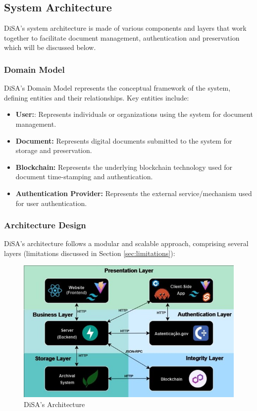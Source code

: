 \documentclass[a4paper,11pt]{article}
\begin{document}
        \subsection{System Architecture}
            \quad DiSA's system architecture is made of various components and layers that work together to facilitate document management, authentication and preservation which will be discussed below.
        
            \subsubsection{Domain Model}
                \quad   DiSA's Domain Model represents the conceptual framework of the system, defining entities and their relationships. Key entities include:
                \begin{itemize}
                    \item \textbf{User:}: Represents individuals or organizations using the system for document management.
                    \item \textbf{Document:} Represents digital documents submitted to the system for storage and preservation.
                    \item \textbf{Blockchain:} Represents the underlying blockchain technology used for document time-stamping and authentication.
                    \item \textbf{Authentication Provider:} Represents the external service/mechanism used for user authentication.
                \end{itemize}
                
            \subsubsection{Architecture Design}
                \quad DiSA's architecture follows a modular and scalable approach, comprising several layers (limitations discussed in Section \ref{sec:limitations}):
                \begin{figure}[htbp]
                    \centering
                    \includegraphics[width=\linewidth]{images/Architechture.jpeg}
                    \caption{DiSA's Architecture}
                    \label{architecture}
                \end{figure}
                
\end{document}
